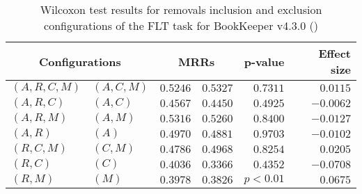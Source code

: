 
\begin{table}
\begin{spacing}{1.2}
\centering
\caption{Wilcoxon test results for removals inclusion and exclusion configurations of the FLT task for BookKeeper v4.3.0 (\ctwo)}
\label{table:versus-wilcox-bookkeeper-flt-removals}
\begin{tabular}{ll|rr|rr}
\toprule
      \multicolumn{2}{c|}{Configurations} &                \multicolumn{2}{c|}{MRRs} &             p-value & Effect size \\
\midrule
 $(A,R,C,M)$ &  $(A,C,M)$ &       $0.5246$ &  $\bm{0.5327}$ & $0.7311$ &    $0.0115$ \\
   $(A,R,C)$ &    $(A,C)$ &  $\bm{0.4567}$ &       $0.4450$ & $0.4925$ &   $-0.0062$ \\
   $(A,R,M)$ &    $(A,M)$ &  $\bm{0.5316}$ &       $0.5260$ & $0.8400$ &   $-0.0127$ \\
     $(A,R)$ &      $(A)$ &  $\bm{0.4970}$ &       $0.4881$ & $0.9703$ &   $-0.0102$ \\
   $(R,C,M)$ &    $(C,M)$ &       $0.4786$ &  $\bm{0.4968}$ & $0.8254$ &    $0.0205$ \\
     $(R,C)$ &      $(C)$ &  $\bm{0.4036}$ &       $0.3366$ & $0.4352$ &   $-0.0708$ \\
     $(R,M)$ &      $(M)$ &  $\bm{0.3978}$ &       $0.3826$ & $p<0.01$ &    $0.0675$ \\
\bottomrule
\end{tabular}

\end{spacing}
\end{table}

